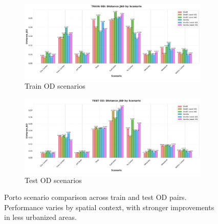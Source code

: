 \begin{figure}[H]
    \centering
    \begin{subfigure}{0.49\linewidth}
        \centering
        \includegraphics[width=\linewidth]{assets/plots/eval/porto/scenarios/train_od_scenario_comparison.pdf}
        \caption{Train OD scenarios}
    \end{subfigure}
    \begin{subfigure}{0.49\linewidth}
        \centering
        \includegraphics[width=\linewidth]{assets/plots/eval/porto/scenarios/test_od_scenario_comparison.pdf}
        \caption{Test OD scenarios}
    \end{subfigure}
    \caption{Porto scenario comparison across train and test OD pairs. Performance varies by spatial context, with stronger improvements in less urbanized areas.}
    \label{fig:appendix-porto-scenario-comparison}
\end{figure}

